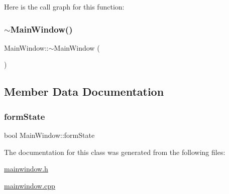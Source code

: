 Here is the call graph for this function\+:
\mbox{\label{class_main_window_ae98d00a93bc118200eeef9f9bba1dba7}} 
\subsubsection{\texorpdfstring{$\sim$\+Main\+Window()}{~MainWindow()}}
{\footnotesize\ttfamily Main\+Window\+::$\sim$\+Main\+Window (\begin{DoxyParamCaption}{ }\end{DoxyParamCaption})}



\subsection{Member Data Documentation}
\mbox{\label{class_main_window_ad1e712b13ea93ba85f22fd93325e2eb9}} 
\subsubsection{\texorpdfstring{form\+State}{formState}}
{\footnotesize\ttfamily bool Main\+Window\+::form\+State}



The documentation for this class was generated from the following files\+:\begin{DoxyCompactItemize}
\item 
\hyperlink{mainwindow_8h}{mainwindow.\+h}\item 
\hyperlink{mainwindow_8cpp}{mainwindow.\+cpp}\end{DoxyCompactItemize}
